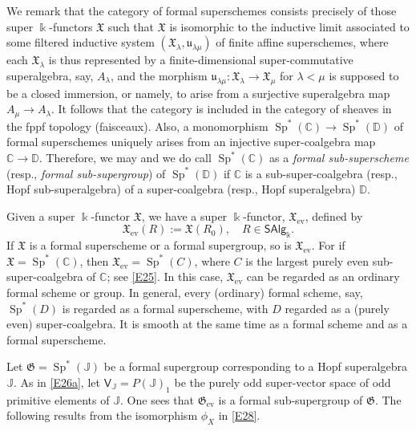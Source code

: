 \documentclass[11pt, a4paper]{amsart}
\theoremstyle{definition}
\numberwithin{equation}{section}
\begin{document}
We remark that
the category of formal superschemes consists precisely 
of those super $\Bbbk$-functors $\mathfrak{X}$ such that
$\mathfrak{X}$ is isomorphic to the inductive limit associated to some filtered inductive system 
$(\mathfrak{X}_{\lambda}, \mathfrak{u}_{\lambda\mu})$ of finite affine superschemes, where each $\mathfrak{X}_{\lambda}$ is 
thus represented
by a finite-dimensional super-commutative superalgebra, say, $A_{\lambda}$, and the morphism 
$\mathfrak{u}_{\lambda\mu} : \mathfrak{X}_{\lambda}\to \mathfrak{X}_{\mu}$ for $\lambda <\mu$ is supposed to be a
closed immersion, or namely, to arise from a surjective superalgebra map $A_{\mu}\to A_{\lambda}$. 
It follows that the category is included in the category of sheaves in the fppf topology (faisceaux).
Also, a monomorphism 
$\operatorname{Sp}^*(\mathbb{C})\to \operatorname{Sp}^*(\mathbb{D})$ of formal superschemes uniquely
arises from an injective super-coalgebra map $\mathbb{C}\to \mathbb{D}$. Therefore, we may and we do 
call $\operatorname{Sp}^*(\mathbb{C})$ as a \emph{formal sub-superscheme} (resp., \emph{formal sub-supergroup}) of $\operatorname{Sp}^*(\mathbb{D})$ if $\mathbb{C}$ is a sub-super-coalgebra 
(resp., Hopf sub-superalgebra) of a super-coalgebra (resp., Hopf superalgebra) $\mathbb{D}$. 

Given a super $\Bbbk$-functor $\mathfrak{X}$,  we have a super $\Bbbk$-functor, $\mathfrak{X}_{\mathrm{ev}}$,
defined by
\[
\mathfrak{X}_{\mathrm{ev}}(R):=\mathfrak{X}(R_0),\quad R\in \mathsf{SAlg}_{\Bbbk}.
\] 
If $\mathfrak{X}$ is a formal superscheme or a formal supergroup, so is $\mathfrak{X}_{\mathrm{ev}}$. For if 
$\mathfrak{X}=\operatorname{Sp}^*(\mathbb{C})$, then $\mathfrak{X}_{\mathrm{ev}}=\operatorname{Sp}^*(C)$,
where $C$ is the largest purely even sub-super-coalgebra of $\mathbb{C}$; see \eqref{E25}. 
In this case, $\mathfrak{X}_{\mathrm{ev}}$ can be regarded as an ordinary formal scheme or group. 
In general, every
(ordinary) formal scheme, say, $\operatorname{Sp}^*(D)$ is regarded as a formal superscheme, with $D$
regarded as a (purely even) super-coalgebra. It is smooth at the same time as a formal scheme
and as a formal superscheme. 

Let
$
\mathfrak{G}=\operatorname{Sp}^*(\mathbb{J})
$
be a formal supergroup corresponding to a Hopf superalgebra $\mathbb{J}$. As in \eqref{E26a}, let $\mathsf{V}_{\mathbb{J}}=P(\mathbb{J})_1$
be the purely odd super-vector space of odd primitive elements of $\mathbb{J}$. One sees that 
$\mathfrak{G}_{\operatorname{ev}}$ is a formal sub-supergroup of $\mathfrak{G}$. 
The following results from the isomorphism $\phi_X$ in \eqref{E28}. 
\end{document}
